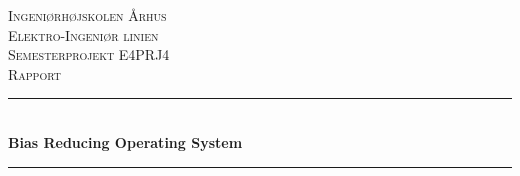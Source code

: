 \newcommand{\HRule}{\rule{\linewidth}{0.5mm}} %

\begin{center} %
 

\textsc{\LARGE Ingeniørhøjskolen Århus}\\[1.5cm] %
\textsc{\Large Elektro-Ingeniør linien}\\[0.5cm] %
\textsc{\large Semesterprojekt E4PRJ4}\\[0.5cm] %
\textsc{\large Rapport}\\[0.5cm] 


\HRule \\[0.4cm]
{ \huge \bfseries Bias Reducing Operating System}\\[0.4cm] %
\HRule \\[1.5cm]
 


\end{center}
